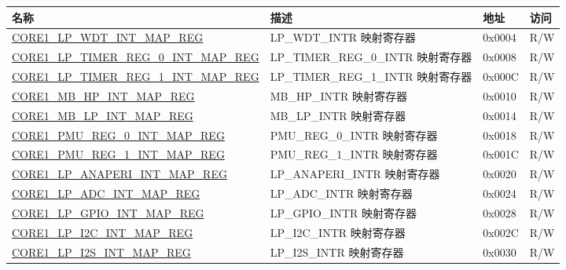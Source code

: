\begin{longtable}{ | p{8.7cm} | p{6.2cm} | p{1.3cm} | p{1cm} | }
\hline\rowcolor{lightgray}
名称 & 描述 &  地址 & 访问 \\ \hline
\endhead

\hyperref[regdesc:CORE1LPWDTINTMAPREG]{CORE1\_LP\_WDT\_INT\_MAP\_REG} & LP\_WDT\_INTR 映射寄存器 & 0x0004 & R/W \\ \hline

\hyperref[regdesc:CORE1LPTIMERREG0INTMAPREG]{CORE1\_LP\_TIMER\_REG\_0\_INT\_MAP\_REG} & LP\_TIMER\_REG\_0\_INTR 映射寄存器 & 0x0008 & R/W \\ \hline

\hyperref[regdesc:CORE1LPTIMERREG1INTMAPREG]{CORE1\_LP\_TIMER\_REG\_1\_INT\_MAP\_REG} & LP\_TIMER\_REG\_1\_INTR 映射寄存器 & 0x000C & R/W \\ \hline

\hyperref[regdesc:CORE1MBHPINTMAPREG]{CORE1\_MB\_HP\_INT\_MAP\_REG} & MB\_HP\_INTR 映射寄存器 & 0x0010 & R/W \\ \hline

\hyperref[regdesc:CORE1MBLPINTMAPREG]{CORE1\_MB\_LP\_INT\_MAP\_REG} & MB\_LP\_INTR 映射寄存器 & 0x0014 & R/W \\ \hline

\hyperref[regdesc:CORE1PMUREG0INTMAPREG]{CORE1\_PMU\_REG\_0\_INT\_MAP\_REG} & PMU\_REG\_0\_INTR 映射寄存器 & 0x0018 & R/W \\ \hline

\hyperref[regdesc:CORE1PMUREG1INTMAPREG]{CORE1\_PMU\_REG\_1\_INT\_MAP\_REG} & PMU\_REG\_1\_INTR 映射寄存器 & 0x001C & R/W \\ \hline

\hyperref[regdesc:CORE1LPANAPERIINTMAPREG]{CORE1\_LP\_ANAPERI\_INT\_MAP\_REG} & LP\_ANAPERI\_INTR 映射寄存器 & 0x0020 & R/W \\ \hline

\hyperref[regdesc:CORE1LPADCINTMAPREG]{CORE1\_LP\_ADC\_INT\_MAP\_REG} & LP\_ADC\_INTR 映射寄存器 & 0x0024 & R/W \\ \hline

\hyperref[regdesc:CORE1LPGPIOINTMAPREG]{CORE1\_LP\_GPIO\_INT\_MAP\_REG} & LP\_GPIO\_INTR 映射寄存器 & 0x0028 & R/W \\ \hline

\hyperref[regdesc:CORE1LPI2CINTMAPREG]{CORE1\_LP\_I2C\_INT\_MAP\_REG} & LP\_I2C\_INTR 映射寄存器 & 0x002C & R/W \\ \hline

\hyperref[regdesc:CORE1LPI2SINTMAPREG]{CORE1\_LP\_I2S\_INT\_MAP\_REG} & LP\_I2S\_INTR 映射寄存器 & 0x0030 & R/W \\ \hline


\end{longtable}

